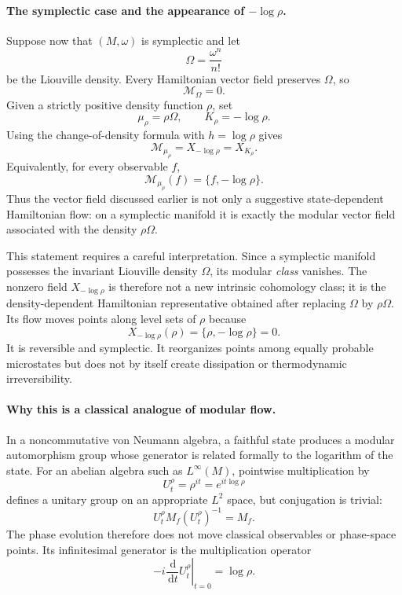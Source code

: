 \documentclass[a4paper,11pt]{article}
\theoremstyle{definition}
\newcommand{\dd}{\,\mathrm{d}}
\begin{document}
\paragraph{The symplectic case and the appearance of $-\log\rho$.}
Suppose now that $(M,\omega)$ is symplectic and let
\[
\Omega=\frac{\omega^n}{n!}
\]
be the Liouville density.  Every Hamiltonian vector field preserves $\Omega$, so
\[
\mathcal{M}_\Omega=0.
\]
Given a strictly positive density function $\rho$, set
\[
\mu_\rho=\rho\Omega,
\qquad
K_\rho=-\log\rho.
\]
Using the change-of-density formula with $h=\log\rho$ gives
\[
\boxed{
\mathcal{M}_{\mu_\rho}=X_{-\log\rho}=X_{K_\rho}.
}
\]
Equivalently, for every observable $f$,
\[
\mathcal{M}_{\mu_\rho}(f)
=
\{f,-\log\rho\}.
\]
Thus the vector field discussed earlier is not only a suggestive state-dependent Hamiltonian flow: on a symplectic manifold it is exactly the modular vector field associated with the density $\rho\Omega$.

This statement requires a careful interpretation.  Since a symplectic manifold possesses the invariant Liouville density $\Omega$, its modular \emph{class} vanishes.  The nonzero field $X_{-\log\rho}$ is therefore not a new intrinsic cohomology class; it is the density-dependent Hamiltonian representative obtained after replacing $\Omega$ by $\rho\Omega$.  Its flow moves points along level sets of $\rho$ because
\[
X_{-\log\rho}(\rho)
=
\{\rho,-\log\rho\}
=0.
\]
It is reversible and symplectic.  It reorganizes points among equally probable microstates but does not by itself create dissipation or thermodynamic irreversibility.

\paragraph{Why this is a classical analogue of modular flow.}
In a noncommutative von Neumann algebra, a faithful state produces a modular automorphism group whose generator is related formally to the logarithm of the state.  For an abelian algebra such as $L^\infty(M)$, pointwise multiplication by
\[
U_t^\rho=\rho^{it}=e^{it\log\rho}
\]
defines a unitary group on an appropriate $L^2$ space, but conjugation is trivial:
\[
U_t^\rho M_f(U_t^\rho)^{-1}=M_f.
\]
The phase evolution therefore does not move classical observables or phase-space points.  Its infinitesimal generator is the multiplication operator
\[
-i\left.\frac{\dd}{\dd t}U_t^\rho\right|_{t=0}
=
\log\rho.
\]
\end{document}
